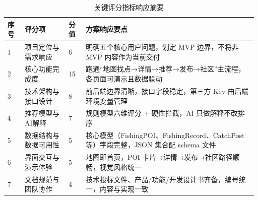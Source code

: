\begin{table}[H]
  \centering
  \caption{关键评分指标响应摘要}
  \label{tab:score-response}
  \begin{tabularx}{\textwidth}{p{0.6cm}|p{3.5cm}|p{4.5cm}|p{5.5cm}}
    \toprule
    \textbf{序号} & \textbf{评分项} & \textbf{分值} & \textbf{方案响应要点} \\
    \midrule
    1 & 项目定位与需求响应 & 6 & 明确五个核心用户问题，划定 MVP 边界，不将非 MVP 内容作为当前交付 \\
    \hline
    2 & 核心功能完成度 & 15 & 跑通“地图找点→详情→推荐→发布→社区”主流程，各页面可演示且数据联动 \\
    \hline
    3 & 技术架构与接口设计 & 8 & 前后端边界清晰，接口字段稳定，第三方 Key 由后端环境变量管理 \\
    \hline
    4 & 推荐模型与AI解释 & 7 & 规则模型六维评分 + 硬性拦截，AI 只做解释不改排序 \\
    \hline
    5 & 数据结构与数据可用性 & 5 & 核心模型（FishingPOI、FishingRecord、CatchPost 等）字段完整，JSON 集合配 schema 文件 \\
    \hline
    6 & 界面交互与演示体验 & 5 & 地图即首页，POI 卡片→详情→发布→社区路径顺畅，视觉风格统一 \\
    \hline
    7 & 文档规范与团队协作 & 4 & 技术投标文件、产品/功能/开发设计书齐备，编号统一，内容与实现一致 \\
    \bottomrule
  \end{tabularx}
\end{table}
